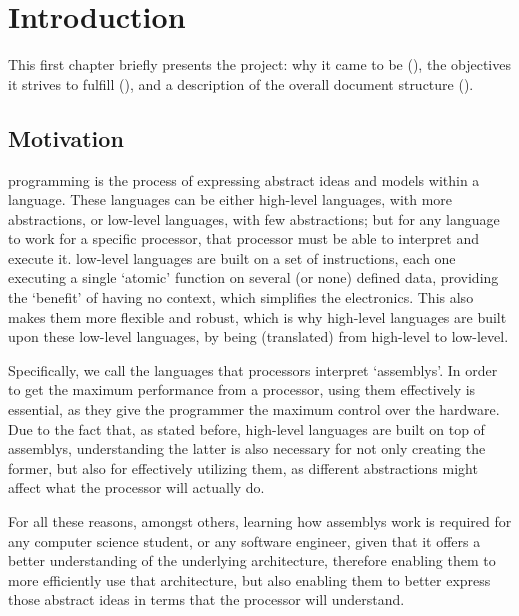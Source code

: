 \chapter{Introduction}\label{chap:introduction}
This first chapter briefly presents the project: why it came to be (), the objectives it strives to fulfill (), and a description of the overall document structure ().


\section{Motivation}\label{sec:motivation}
\Gls{programming} is the process of expressing abstract ideas and models within a language. These languages can be either \glspl{high-level language}, with more abstractions, or \glspl{low-level language}, with few abstractions; but for any language to work for a specific \gls{processor}, that \gls{processor} must be able to interpret and execute it. \Glspl{low-level language} are built on a set of instructions, each one executing a single `atomic' function on several (or none) defined data, providing the `benefit' of having no context, which simplifies the electronics. This also makes them more flexible and robust, which is why \glspl{high-level language} are built upon these \glspl{low-level language}, by being  (translated) from high-level to low-level.

Specifically, we call  the languages that processors interpret `\glspl{assembly}'. In order to get the maximum performance from a \gls{processor}, using them effectively is essential, as they give the \gls{programmer} the maximum control over the hardware. Due to the fact that, as stated before, \glspl{high-level language} are built on top of \glspl{assembly}, understanding the latter is also necessary for not only creating the former, but also for effectively utilizing them, as different abstractions might affect what the \gls{processor} will actually do.

For all these reasons, amongst others, learning how \glspl{assembly} work is required for any \gls{computer science} student, or any \gls{software engineer}, given that it offers a better understanding of the underlying architecture, therefore enabling them to more efficiently use that architecture, but also enabling them to better express those abstract ideas in terms that the \gls{processor} will understand.


